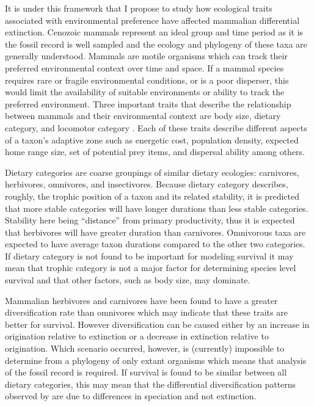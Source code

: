\documentclass[11pt,letterpaper]{article}
\begin{document}
It is under this framework that I propose to study how ecological traits associated with environmental preference have affected mammalian differential extinction. Cenozoic mammals represent an ideal group and time period as it is the fossil record is well sampled and the ecology and phylogeny of these taxa are generally understood. Mammals are motile organisms which can track their preferred environmental context over time and space. If a mammal species requires rare or fragile environmental conditions, or is a poor disperser, this would limit the availability of suitable environments or ability to track the preferred environment. Three important traits that describe the relationship between mammals and their environmental context are body size, dietary category, and locomotor category \citep{Smith2004,Smith2008b,Damuth1981a,Damuth1979,Jernvall2004,Lyons2005,Lyons2010}. Each of these traits describe different aspects of a taxon's adaptive zone such as energetic cost, population density, expected home range size, set of potential prey items, and dispersal ability among others. 



Dietary categories are coarse groupings of similar dietary ecologies: carnivores, herbivores, omnivores, and insectivores. Because dietary category describes, roughly, the trophic position of a taxon and its related stability, it is predicted that more stable categories will have longer durations than less stable categories. Stability here being ``distance'' from primary productivity, thus it is expected that herbivores will have greater duration than carnivores. Omnivorous taxa are expected to have average taxon durations compared to the other two categories. If dietary category is not found to be important for modeling survival it may mean that trophic category is not a major factor for determining species level survival and that other factors, such as body size, may dominate.

Mammalian herbivores and carnivores have been found to have a greater diversification rate than omnivores \citep{Price2012} which may indicate that these traits are better for survival. However diversification can be caused either by an increase in origination relative to extinction or a decrease in extinction relative to origination. Which scenario occurred, however, is (currently) impossible to determine from a phylogeny of only extant organisms \citep{Rabosky2010a} which means that analysis of the fossil record is required. If survival is found to be similar between all dietary categories, this may mean that the differential diversification patterns observed by \citet{Price2012} are due to differences in speciation and not extinction.
\end{document}
